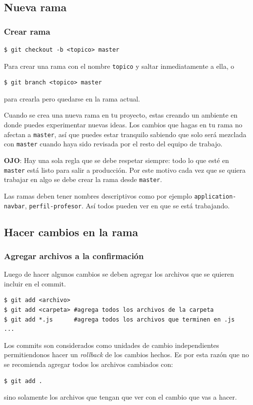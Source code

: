 \documentclass[10pt]{beamer}
\begin{document}
\subsection{Nueva rama}
\begin{frame}
	\frametitle{Crear rama}

\begin{lstlisting}
$ git checkout -b <topico> master
\end{lstlisting}

	Para crear una rama con el nombre \texttt{topico} y saltar inmediatamente a 
	ella, o

\begin{lstlisting}
$ git branch <topico> master
\end{lstlisting}

	para crearla pero quedarse en la rama actual.

	Cuando se crea una nueva rama en tu proyecto, estas creando un ambiente en 
	donde puedes experimentar nuevas ideas. Los cambios que hagas en tu rama no 
	afectan a \texttt{master}, así que puedes estar tranquilo sabiendo que solo 
	será mezclada con \texttt{master} cuando haya sido revisada por el resto 
	del equipo de trabajo.

	\textbf{OJO}: Hay una sola regla que se debe respetar siempre: todo lo que 
	esté en \texttt{master} está listo para salir a producción. Por este motivo 
	cada vez que se quiera trabajar en algo se debe crear la rama desde 
	\texttt{master}.

	Las ramas deben tener nombres descriptivos como por ejemplo 
	\texttt{application-navbar}, \texttt{perfil-profesor}. Así todos pueden ver 
	en que se está trabajando.
\end{frame} 

\subsection{Hacer cambios en la rama}
\begin{frame}[fragile]
	\frametitle{Agregar archivos a la confirmación}

	Luego de hacer algunos cambios se deben agregar los archivos que se quieren 
	incluir en el commit.

\begin{lstlisting}
$ git add <archivo>
$ git add <carpeta> #agrega todos los archivos de la carpeta
$ git add *.js      #agrega todos los archivos que terminen en .js
...
\end{lstlisting}

	Los commits son considerados como unidades de cambio independientes 
	permitiendonos hacer un \emph{rollback} de los cambios hechos. Es por esta 
	razón que no se recomienda agregar todos los archivos cambiados con:


\begin{lstlisting}
$ git add .
\end{lstlisting}

	sino solamente los archivos que tengan que ver con el cambio que vas a 
	hacer.
\end{frame} 
\end{document}
